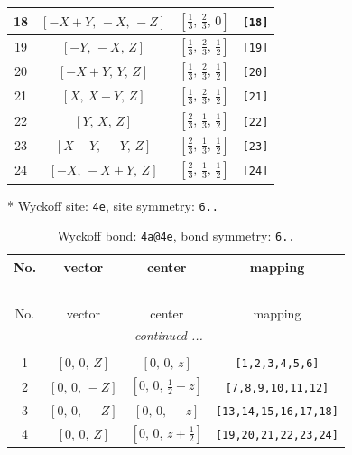 \documentclass[fleqn,8pt]{jsarticle}
\begin{document}
\begin{longtable}{cccc}
18 & $\left[ - X + Y,\, - X,\, - Z \right]$ & $\left[ \frac{1}{3},\, \frac{2}{3},\, 0 \right]$ & {\tt [18]} \\ \hline
19 & $\left[ - Y,\, - X,\, Z \right]$ & $\left[ \frac{1}{3},\, \frac{2}{3},\, \frac{1}{2} \right]$ & {\tt [19]} \\ \hline
20 & $\left[ - X + Y,\, Y,\, Z \right]$ & $\left[ \frac{1}{3},\, \frac{2}{3},\, \frac{1}{2} \right]$ & {\tt [20]} \\ \hline
21 & $\left[ X,\, X - Y,\, Z \right]$ & $\left[ \frac{1}{3},\, \frac{2}{3},\, \frac{1}{2} \right]$ & {\tt [21]} \\ \hline
22 & $\left[ Y,\, X,\, Z \right]$ & $\left[ \frac{2}{3},\, \frac{1}{3},\, \frac{1}{2} \right]$ & {\tt [22]} \\ \hline
23 & $\left[ X - Y,\, - Y,\, Z \right]$ & $\left[ \frac{2}{3},\, \frac{1}{3},\, \frac{1}{2} \right]$ & {\tt [23]} \\ \hline
24 & $\left[ - X,\, - X + Y,\, Z \right]$ & $\left[ \frac{2}{3},\, \frac{1}{3},\, \frac{1}{2} \right]$ & {\tt [24]} \\
\end{longtable}
* Wyckoff site: {\tt 4e}, site symmetry: {\tt 6..}
\renewcommand{\arraystretch}{1.2}
\begin{longtable}{cccc}
\caption{Wyckoff bond: {\tt 4a@4e}, bond symmetry: {\tt 6..}}
 \\
 \hline \hline
No. & vector & center & mapping \\ \hline \endfirsthead

\multicolumn{3}{l}{\tablename\ \thetable{}} \\
 \hline \hline
No. & vector & center & mapping \\ \hline \endhead

 \hline \hline
\multicolumn{3}{r}{\footnotesize\it continued ...} \\ \endfoot

 \hline \hline
\multicolumn{3}{r}{} \\ \endlastfoot

1 & $\left[ 0,\, 0,\, Z \right]$ & $\left[ 0,\, 0,\, z \right]$ & {\tt [1,2,3,4,5,6]} \\ \hline
2 & $\left[ 0,\, 0,\, - Z \right]$ & $\left[ 0,\, 0,\, \frac{1}{2} - z \right]$ & {\tt [7,8,9,10,11,12]} \\ \hline
3 & $\left[ 0,\, 0,\, - Z \right]$ & $\left[ 0,\, 0,\, - z \right]$ & {\tt [13,14,15,16,17,18]} \\ \hline
4 & $\left[ 0,\, 0,\, Z \right]$ & $\left[ 0,\, 0,\, z + \frac{1}{2} \right]$ & {\tt [19,20,21,22,23,24]} \\
\end{longtable}
\end{document}
